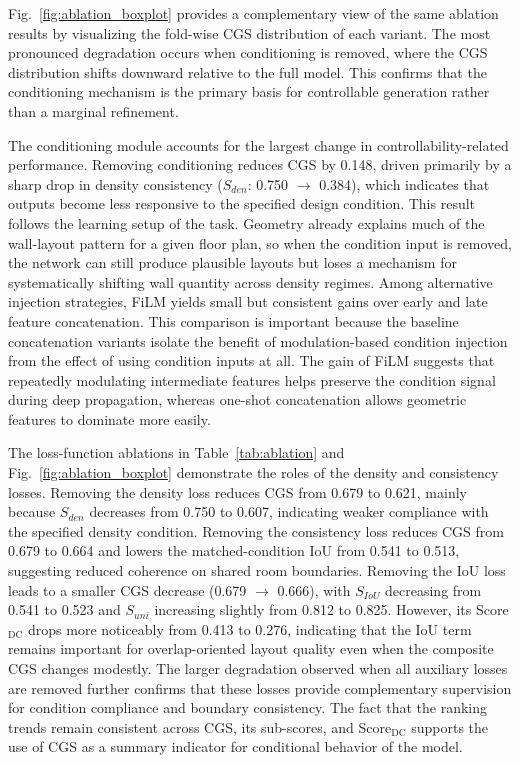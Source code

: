 Fig.~\ref{fig:ablation_boxplot} provides a complementary view of the same ablation results by visualizing the fold-wise CGS distribution of each variant. The most pronounced degradation occurs when conditioning is removed, where the CGS distribution shifts downward relative to the full model. This confirms that the conditioning mechanism is the primary basis for controllable generation rather than a marginal refinement.

The conditioning module accounts for the largest change in controllability-related performance. Removing conditioning reduces CGS by 0.148, driven primarily by a sharp drop in density consistency ($S_{den}$: 0.750 $\rightarrow$ 0.384), which indicates that outputs become less responsive to the specified design condition. This result follows the learning setup of the task. Geometry already explains much of the wall-layout pattern for a given floor plan, so when the condition input is removed, the network can still produce plausible layouts but loses a mechanism for systematically shifting wall quantity across density regimes. Among alternative injection strategies, FiLM yields small but consistent gains over early and late feature concatenation. This comparison is important because the baseline concatenation variants isolate the benefit of modulation-based condition injection from the effect of using condition inputs at all. The gain of FiLM suggests that repeatedly modulating intermediate features helps preserve the condition signal during deep propagation, whereas one-shot concatenation allows geometric features to dominate more easily.

The loss-function ablations in Table~\ref{tab:ablation} and Fig.~\ref{fig:ablation_boxplot} demonstrate the roles of the density and consistency losses. Removing the density loss reduces CGS from 0.679 to 0.621, mainly because $S_{den}$ decreases from 0.750 to 0.607, indicating weaker compliance with the specified density condition. Removing the consistency loss reduces CGS from 0.679 to 0.664 and lowers the matched-condition IoU from 0.541 to 0.513, suggesting reduced coherence on shared room boundaries. Removing the IoU loss leads to a smaller CGS decrease (0.679 $\rightarrow$ 0.666), with $S_{IoU}$ decreasing from 0.541 to 0.523 and $S_{uni}$ increasing slightly from 0.812 to 0.825. However, its Score$_{\text{DC}}$ drops more noticeably from 0.413 to 0.276, indicating that the IoU term remains important for overlap-oriented layout quality even when the composite CGS changes modestly. The larger degradation observed when all auxiliary losses are removed further confirms that these losses provide complementary supervision for condition compliance and boundary consistency. The fact that the ranking trends remain consistent across CGS, its sub-scores, and Score$_{\text{DC}}$ supports the use of CGS as a summary indicator for conditional behavior of the model.

